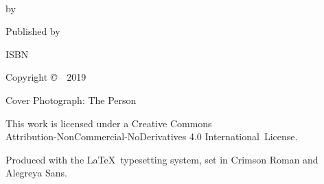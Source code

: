 \cleartoverso
\thispagestyle{empty}

{\copyrightsize
\centering
\setlength{\parindent}{0pt}%
\setlength{\parskip}{0.8\baselineskip}%

\thetitle\\
by \theauthor

Published by \thePublisher

ISBN \theISBN

Copyright \copyright\ \thePublisher\ 2019

Cover Photograph: The Person

\vfill

This work is licensed under a Creative Commons\\
Attribution-NonCommercial-NoDerivatives 4.0 International~License.

Produced with the \LaTeX\ typesetting system, set in Crimson Roman and Alegreya Sans.

\theEditionInfo

}
